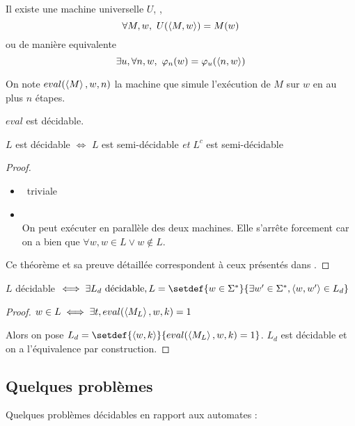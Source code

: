 \begin{lemma}\label{lem:univ}
	Il existe une machine universelle $U$, \ie, $$\forall M,w, \  U (\left\langle M,w\right\rangle) = M (w)$$
	ou de manière equivalente
	$$\exists u, \forall n,w, \ \varphi_n(w) = \varphi_u(\left\langle n,w\right\rangle)$$
\end{lemma}

\begin{definition}[eval]
	On note $eval(\left\langle M\right\rangle, w, n)$ la machine que simule l'exécution de $M$ sur $w$ en au plus $n$ étapes.
\end{definition}

\begin{prop}[Admis]
	$eval$ est décidable.
\end{prop}

\begin{prop}
	$L$ est décidable $\iff$ $L$ est semi-décidable \emph{et} $L^c$ est semi-décidable
\end{prop}

\begin{proof}
	\begin{itemize}
		\item \bimpLR \ triviale
		\item \bimpRL \\
		      On peut exécuter en parallèle des deux machines. Elle s'arrête forcement car on a bien que $\forall w, w \in L \lor w \notin L$.
	\end{itemize}
	Ce théorème et sa preuve détaillée correspondent à ceux présentés dans \cite[Theorem~4.22]{sipser}.
\end{proof}


\begin{prop}
	$L$ décidable $\iff \exists L_d \text{ décidable}, L = \setdef {w \in \mots} {\exists w' \in \mots, \encode{w,w'} \in L_d}$
\end{prop}


\begin{proof}
	$w \in L \iff \exists t, eval(\left\langle M_L\right\rangle, w, k) = 1$

	Alors on pose $L_d = \setdef {\encode{w, k}} {eval(\encode {M_L}, w,k) = 1}$.
	$L_d$ est décidable et on a l'équivalence par construction.
\end{proof}


\subsection{Quelques problèmes}

Quelques problèmes décidables en rapport aux automates :

